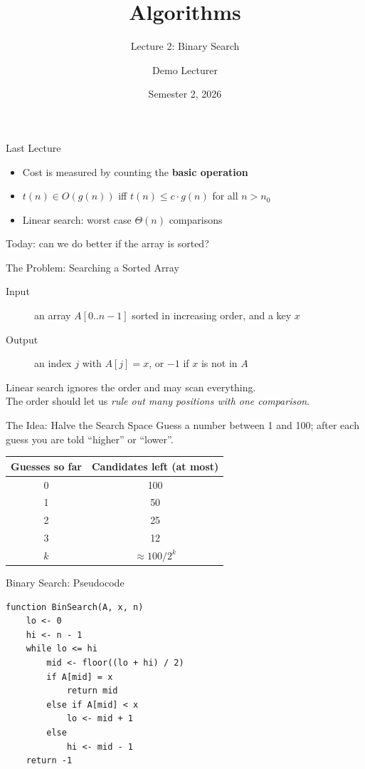 \documentclass[aspectratio=169,11pt]{beamer}
\title{Algorithms}
\subtitle{Lecture 2: Binary Search}
\author{Demo Lecturer}
\date{Semester 2, 2026}
\begin{document}
\begin{frame}
  \titlepage
\end{frame}

\begin{frame}{Last Lecture}
  \begin{itemize}
    \item Cost is measured by counting the \textbf{basic operation}
    \item $t(n) \in O(g(n))$ iff $t(n) \le c \cdot g(n)$ for all $n > n_0$
    \item Linear search: worst case $\Theta(n)$ comparisons
  \end{itemize}
  \medskip
  Today: can we do better if the array is \alert{sorted}?
\end{frame}

\begin{frame}{The Problem: Searching a Sorted Array}
  \begin{description}
    \item[Input] an array $A[0..n-1]$ sorted in increasing order, and a key $x$
    \item[Output] an index $j$ with $A[j] = x$, or $-1$ if $x$ is not in $A$
  \end{description}
  \bigskip
  Linear search ignores the order and may scan everything.\\
  The order should let us \emph{rule out many positions with one comparison}.
\end{frame}

\begin{frame}{The Idea: Halve the Search Space}
  Guess a number between 1 and 100; after each guess you are told ``higher'' or ``lower''.
  \medskip
  \begin{center}
  \begin{tabular}{cc}
    \hline
    Guesses so far & Candidates left (at most) \\
    \hline
    0 & 100 \\
    1 & 50 \\
    2 & 25 \\
    3 & 12 \\
    $k$ & $\approx 100 / 2^k$ \\
    \hline
  \end{tabular}
  \end{center}
\end{frame}

\begin{frame}[fragile]{Binary Search: Pseudocode}
\begin{verbatim}
function BinSearch(A, x, n)
    lo <- 0
    hi <- n - 1
    while lo <= hi
        mid <- floor((lo + hi) / 2)
        if A[mid] = x
            return mid
        else if A[mid] < x
            lo <- mid + 1
        else
            hi <- mid - 1
    return -1
\end{verbatim}
\end{frame}
\end{document}

